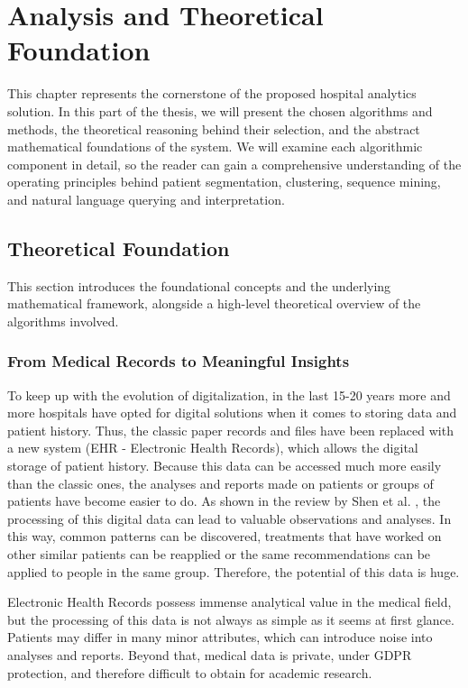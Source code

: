 \chapter{Analysis and Theoretical Foundation}
\label{ch:analysis}
\pagestyle{fancy}

This chapter represents the cornerstone of the proposed hospital analytics solution. In this part of the thesis, we will present the chosen algorithms and methods, the theoretical reasoning behind their selection, and the abstract mathematical foundations of the system. We will examine each algorithmic component in detail, so the reader can gain a comprehensive understanding of the operating principles behind patient segmentation, clustering, sequence mining, and natural language querying and interpretation.

\section{Theoretical Foundation}

This section introduces the foundational concepts and the underlying mathematical framework, alongside a high-level theoretical overview of the algorithms involved.

\subsection{From Medical Records to Meaningful Insights}

To keep up with the evolution of digitalization, in the last 15-20 years more and more hospitals have opted for digital solutions when it comes to storing data and patient history. Thus, the classic paper records and files have been replaced with a new system (EHR - Electronic Health Records), which allows the digital storage of patient history. Because this data can be accessed much more easily than the classic ones, the analyses and reports made on patients or groups of patients have become easier to do. As shown in the review by Shen et al. \cite{shen2025}, the processing of this digital data can lead to valuable observations and analyses. In this way, common patterns can be discovered, treatments that have worked on other similar patients can be reapplied or the same recommendations can be applied to people in the same group. Therefore, the potential of this data is huge.

Electronic Health Records possess immense analytical value in the medical field, but the processing of this data is not always as simple as it seems at first glance. Patients may differ in many minor attributes, which can introduce noise into analyses and reports. Beyond that, medical data is private, under GDPR protection, and therefore difficult to obtain for academic research.

